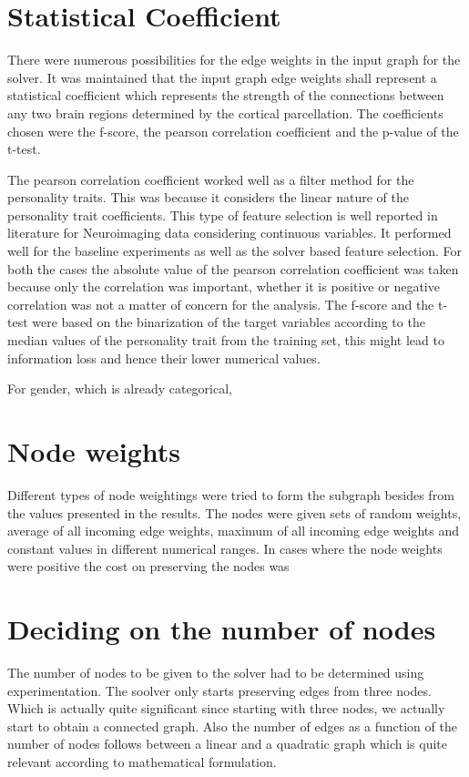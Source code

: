 \documentclass[msthesis.tex]{subfiles}
\begin{document}
\section{Statistical Coefficient}
There were numerous possibilities for the edge weights in the input graph for the solver. It was maintained that the input graph edge weights shall represent a statistical coefficient which represents the strength of the connections between any two brain regions determined by the cortical parcellation. The coefficients chosen were the f-score, the pearson correlation coefficient and the p-value of the t-test. 

The pearson correlation coefficient worked well as a filter method for the personality traits. This was because it considers the linear nature of the personality trait coefficients. This type of feature selection is well reported in literature for Neuroimaging data considering continuous variables. It performed well for the baseline experiments as well as the solver based feature selection. For both the cases the absolute value of the pearson correlation coefficient was taken because only the correlation was important, whether it is positive or negative correlation was not a matter of concern for the analysis. The f-score and the t-test were based on the binarization of the target variables according to the median values of the personality trait from the training set, this might lead to information loss and hence their lower numerical values. 

For gender, which is already categorical, 

\section{Node weights}
Different types of node weightings were tried to form the subgraph besides from the values presented in the results. The nodes were given sets of random weights, average of all incoming edge weights, maximum of all incoming edge weights and constant values in different numerical ranges. 
In cases where the node weights were positive the cost on preserving the nodes was 
\section{Deciding on the number of nodes}
The number of nodes to be given to the solver had to be determined using experimentation. The soolver only starts preserving edges from three nodes. Which is actually quite significant since starting with three nodes, we actually start to obtain a connected graph. Also the number of edges as a function of the number of nodes follows between a linear and a quadratic graph which is quite relevant according to mathematical formulation. 
\end{document}
